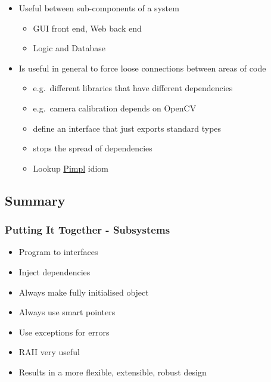 \begin{itemize}
\itemsep1pt\parskip0pt
\item
  Useful between sub-components of a system

  \begin{itemize}
  \itemsep1pt\parskip0pt
  \item
    GUI front end, Web back end
  \item
    Logic and Database
  \end{itemize}
\item
  Is useful in general to force loose connections between areas of code

  \begin{itemize}
  \itemsep1pt\parskip0pt
  \item
    e.g.~different libraries that have different dependencies
  \item
    e.g.~camera calibration depends on OpenCV
  \item
    define an interface that just exports standard types
  \item
    stops the spread of dependencies
  \item
    Lookup \href{http://en.cppreference.com/w/cpp/language/pimpl}{Pimpl}
    idiom
  \end{itemize}
\end{itemize}

\subsection{Summary}\label{summary-4}

\subsubsection{Putting It Together -
Subsystems}\label{putting-it-together---subsystems}

\begin{itemize}
\itemsep1pt\parskip0pt
\item
  Program to interfaces
\item
  Inject dependencies
\item
  Always make fully initialised object
\item
  Always use smart pointers
\item
  Use exceptions for errors
\item
  RAII very useful
\item
  Results in a more flexible, extensible, robust design
\end{itemize}

